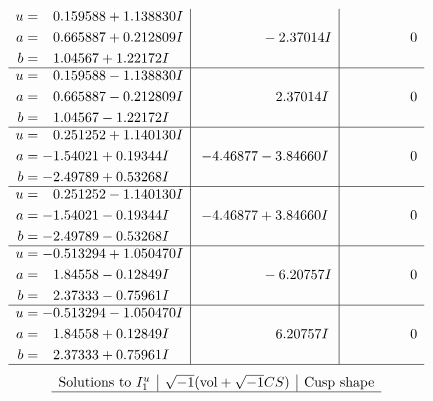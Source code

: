 \documentclass[1p]{elsarticle_modified}
\theoremstyle{definition}
\newcommand{\I}{\sqrt{-1}}
\begin{document}
$$\begin{array}{c|c|c}
\begin{aligned}
u &= \phantom{-}0.159588 + 1.138830 I \\
a &= \phantom{-}0.665887 + 0.212809 I \\
b &= \phantom{-}1.04567 + 1.22172 I\end{aligned}
 & \phantom{-0.000000 } -2.37014 I & \phantom{-0.000000 } 0 \\ \hline\begin{aligned}
u &= \phantom{-}0.159588 - 1.138830 I \\
a &= \phantom{-}0.665887 - 0.212809 I \\
b &= \phantom{-}1.04567 - 1.22172 I\end{aligned}
 & \phantom{-0.000000 -}2.37014 I & \phantom{-0.000000 } 0 \\ \hline\begin{aligned}
u &= \phantom{-}0.251252 + 1.140130 I \\
a &= -1.54021 + 0.19344 I \\
b &= -2.49789 + 0.53268 I\end{aligned}
 & -4.46877 - 3.84660 I & \phantom{-0.000000 } 0 \\ \hline\begin{aligned}
u &= \phantom{-}0.251252 - 1.140130 I \\
a &= -1.54021 - 0.19344 I \\
b &= -2.49789 - 0.53268 I\end{aligned}
 & -4.46877 + 3.84660 I & \phantom{-0.000000 } 0 \\ \hline\begin{aligned}
u &= -0.513294 + 1.050470 I \\
a &= \phantom{-}1.84558 - 0.12849 I \\
b &= \phantom{-}2.37333 - 0.75961 I\end{aligned}
 & \phantom{-0.000000 } -6.20757 I & \phantom{-0.000000 } 0 \\ \hline\begin{aligned}
u &= -0.513294 - 1.050470 I \\
a &= \phantom{-}1.84558 + 0.12849 I \\
b &= \phantom{-}2.37333 + 0.75961 I\end{aligned}
 & \phantom{-0.000000 -}6.20757 I & \phantom{-0.000000 } 0\\
 \hline 
 \end{array}$$\newpage$$\begin{array}{c|c|c}  
\text{Solutions to }I^u_{1}& \I (\text{vol} + \sqrt{-1}CS) & \text{Cusp shape}\\
 \hline 

\end{array}$$
\end{document}
